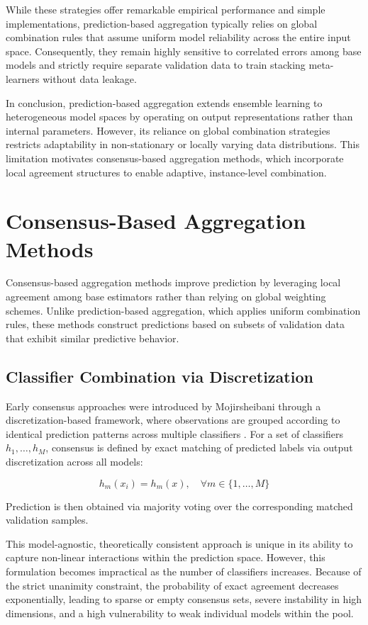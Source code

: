 While these strategies offer remarkable empirical performance and simple implementations, prediction-based aggregation typically relies on global combination rules that assume uniform model reliability across the entire input space. Consequently, they remain highly sensitive to correlated errors among base models and strictly require separate validation data to train stacking meta-learners without data leakage.

In conclusion, prediction-based aggregation extends ensemble learning to heterogeneous model spaces by operating on output representations rather than internal parameters. However, its reliance on global combination strategies restricts adaptability in non-stationary or locally varying data distributions. This limitation motivates consensus-based aggregation methods, which incorporate local agreement structures to enable adaptive, instance-level combination.

\section{Consensus-Based Aggregation Methods}

\hs Consensus-based aggregation methods improve prediction by leveraging local agreement among base estimators rather than relying on global weighting schemes. Unlike prediction-based aggregation, which applies uniform combination rules, these methods construct predictions based on subsets of validation data that exhibit similar predictive behavior.

\subsection{Classifier Combination via Discretization}

\hs Early consensus approaches were introduced by Mojirsheibani through a discretization-based framework, where observations are grouped according to identical prediction patterns across multiple classifiers \cite{mojirsheibani1999}. For a set of classifiers $h_1, \dots, h_M$, consensus is defined by exact matching of predicted labels via output discretization across all models:

\[    
    h_m(x_i) = h_m(x), \quad \forall m \in \{1, \dots, M\}
\]

Prediction is then obtained via majority voting over the corresponding matched validation samples. 

This model-agnostic, theoretically consistent approach is unique in its ability to capture non-linear interactions within the prediction space. However, this formulation becomes impractical as the number of classifiers increases. Because of the strict unanimity constraint, the probability of exact agreement decreases exponentially, leading to sparse or empty consensus sets, severe instability in high dimensions, and a high vulnerability to weak individual models within the pool.

